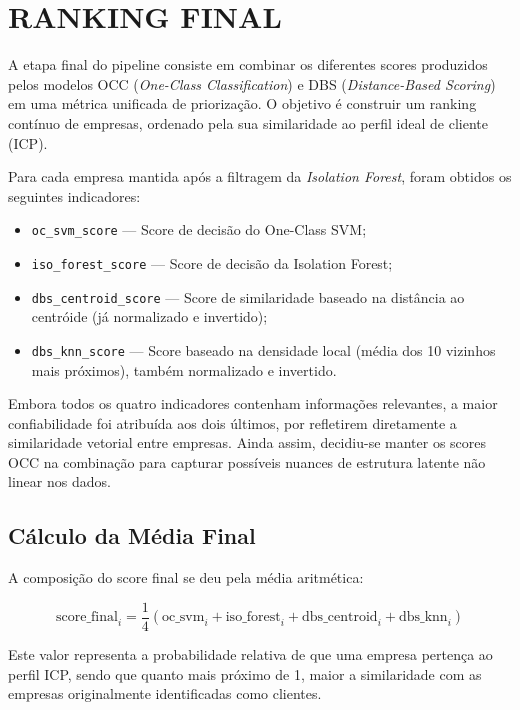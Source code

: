 \section{RANKING FINAL}

A etapa final do pipeline consiste em combinar os diferentes scores produzidos pelos modelos OCC (\textit{One-Class Classification}) e DBS (\textit{Distance-Based Scoring}) em uma métrica unificada de priorização. O objetivo é construir um ranking contínuo de empresas, ordenado pela sua similaridade ao perfil ideal de cliente (ICP).

Para cada empresa mantida após a filtragem da \textit{Isolation Forest}, foram obtidos os seguintes indicadores:
\begin{itemize}
    \item \texttt{oc\_svm\_score} — Score de decisão do One-Class SVM;
    \item \texttt{iso\_forest\_score} — Score de decisão da Isolation Forest;
    \item \texttt{dbs\_centroid\_score} — Score de similaridade baseado na distância ao centróide (já normalizado e invertido);
    \item \texttt{dbs\_knn\_score} — Score baseado na densidade local (média dos 10 vizinhos mais próximos), também normalizado e invertido.
\end{itemize}

Embora todos os quatro indicadores contenham informações relevantes, a maior confiabilidade foi atribuída aos dois últimos, por refletirem diretamente a similaridade vetorial entre empresas. Ainda assim, decidiu-se manter os scores OCC na combinação para capturar possíveis nuances de estrutura latente não linear nos dados.

\subsection{\textbf{Cálculo da Média Final}}

A composição do score final se deu pela média aritmética:

\begin{equation}
\text{score\_final}_i = \frac{1}{4} \left( \text{oc\_svm}_i + \text{iso\_forest}_i + \text{dbs\_centroid}_i + \text{dbs\_knn}_i \right)
\end{equation}

Este valor representa a probabilidade relativa de que uma empresa pertença ao perfil ICP, sendo que quanto mais próximo de 1, maior a similaridade com as empresas originalmente identificadas como clientes.